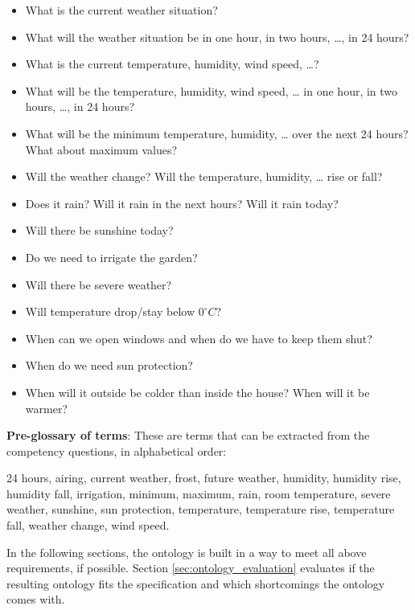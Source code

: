 \begin{mdframed}[linewidth=.6pt]
\begin{itemize}
  \item What is the current weather situation?
  \item What will the weather situation be in one hour, in two hours, …, in 24 hours?
  \item What is the current temperature, humidity, wind speed, …?
  \item What will be the temperature, humidity, wind speed, … in one hour, in two hours, …, in 24 hours?
  \item What will be the minimum temperature, humidity, … over the next 24 hours? What about maximum values?
  \item Will the weather change? Will the temperature, humidity, … rise or fall?
  \item Does it rain? Will it rain in the next hours? Will it rain today?
  \item Will there be sunshine today? 
  \item Do we need to irrigate the garden?
  \item Will there be severe weather?
  \item Will temperature drop/stay below $0^\circ C$?
  \item When can we open windows and when do we have to keep them shut?
  \item When do we need sun protection?
  \item When will it outside be colder than inside the house? When will it be warmer?
\end{itemize}

\setlength{\leftskip}{0cm}

\vspace{.2cm}

\textbf{Pre-glossary of terms}: These are terms that can be extracted from the competency questions, in alphabetical order:

24 hours, airing, current weather, frost, future weather, humidity, humidity rise, humidity fall, irrigation, minimum, maximum, rain, room temperature, severe weather, sunshine, sun protection, temperature, temperature rise, temperature fall, weather change, wind speed.

\setlength{\leftskip}{0cm}

\end{mdframed}

\vspace{.5cm}

In the following sections, the \smarthomeweather ontology is built in a way to meet all above requirements, if possible. Section \ref{sec:ontology_evaluation} evaluates if the resulting ontology fits the specification and which shortcomings the ontology comes with.


